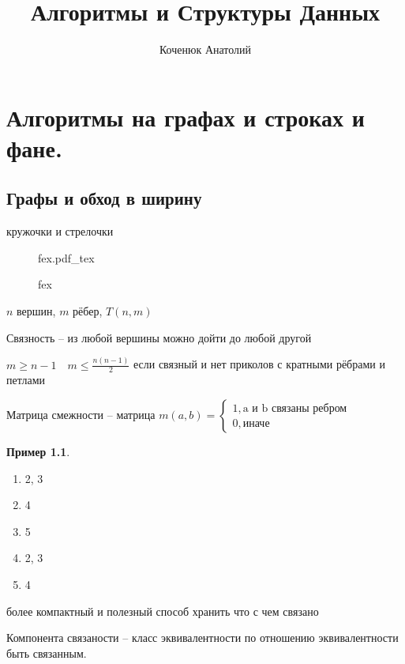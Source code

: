 \documentclass{book}
\author{Коченюк Анатолий}
\title{Алгоритмы и Структуры Данных}
\theoremstyle{definition}
\newtheorem*{example}{Пример}
\newcommand{\incfig}[1]{%
    \def\svgwidth{\columnwidth}
    {#1.pdf_tex}
}
\begin{document}
    \maketitle
    
    \chapter{Алгоритмы на графах и строках и фане.}
    \section{Графы и обход в ширину}
    кружочки и стрелочки 

\begin{figure}[!ht]
    \centering
    \incfig{fex}
    \caption{fex}
    \label{fig:fex}
\end{figure}

$n$ вершин,  $m$ рёбер,  $T(n, m)$

Связность -- из любой вершины можно дойти до любой другой

$m\geqslant n-1\quad m\leqslant \frac{n(n-1)}{2}$ если связный и нет приколов с кратными рёбрами и петлами

\begin{definition}
    Матрица смежности -- матрица $m(a,b) = \begin{cases}
        1, \text{a и b связаны ребром}\\
        0, \text{иначе}
    \end{cases}$
\end{definition}

\begin{example}
    \begin{enumerate}
        \item 2, 3\\
           \item 4\\
           \item 5\\
           \item 2, 3\\
           \item 4\\
    \end{enumerate}

    более компактный и полезный способ хранить что с чем связано
\end{example}

\begin{definition}
    Компонента связаности -- класс эквивалентности по отношению эквивалентности быть связанным.
\end{definition}
\end{document}
